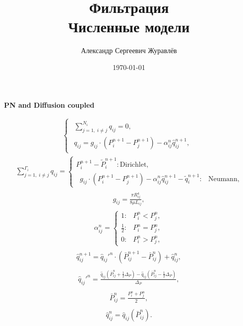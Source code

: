 \documentclass[a4paper,12pt,russian]{extreport}
\author{Александр Сергеевич Журавлёв}
\title{Фильтрация\\Численные модели}
\date{\today}
\begin{document}
\pagecolor{pageColor}
\color{fontColor}
\Russian
\printnomenclature[5em]


\begin{center}
{\large \textbf{PN and Diffusion coupled}}
\end{center}

\begin{eqnarray}
\begin{cases}
\begin{gathered}
\sum^{N_{i}}_{j=1, \; i\neq j} q_{ij} = 0,   \\
q_{ij} = g_{ij} \cdot \left(P^{n+1}_{i} - P^{n+1}_{j}\right) - \alpha^n_{ij} \hat{q}^{n+1}_{ij} ,
\end{gathered}
\end{cases}
\end{eqnarray}
%
\begin{eqnarray}
\sum^{\Gamma_{i}}_{j=1, \; i\neq j} q_{ij}=\begin{cases}
P^{n+1}_{i} - \tilde{P}^{n+1}_{i}: \text{Dirichlet},\\
\; \; g_{ij} \cdot \left(P^{n+1}_{i} - P^{n+1}_{j}\right) - \alpha^n_{ij} \hat{q}^{n+1}_{ij} - \tilde{q}^{n+1}_{i}: & \text{Neumann},
\end{cases}
\end{eqnarray}
%
\begin{eqnarray}
\begin{gathered}
g_{ij} = \frac{\pi R^4_{ij}}{8 \mu L_{ij}},
\end{gathered}
\end{eqnarray}
%
\begin{eqnarray}
\alpha^n_{ij} =\begin{cases}
1: & P^{n}_{i} < P^{n}_{j},\\
 \frac{1}{2} : & P^{n}_{i} = P^{n}_{j},\\
 0: & P^{n}_{i} > P^{n}_{j},
\end{cases}
\end{eqnarray}
%
\begin{eqnarray}
\begin{gathered}
\hat{q}_{ij}^{n+1} = \hat{q}_{ij}'^n \cdot \left(\bar{P}_{ij}^{n+1}-\bar{P}_{ij}^n\right)+\hat{q}_{ij}^n,
\end{gathered}
\end{eqnarray}
%
\begin{eqnarray}
\begin{gathered}
\hat{q}_{ij}'^n = \frac{\hat{q}_{ij}\left(\bar{P}_{ij}^n+ \frac{1}{2}\Delta_P\right)-
\hat{q}_{ij}\left(\bar{P}_{ij}^n-\frac{1}{2}\Delta_P\right)}{{\Delta_P}},
\end{gathered}
\end{eqnarray}
%
\begin{eqnarray}
\begin{gathered}
\bar{P}^{n}_{ij} = \frac{P^n_i+P^n_j}{2}, 
\end{gathered}
\end{eqnarray}
%
\begin{eqnarray}
\begin{gathered}
\hat{q}_{ij}^{n} = \hat{q}_{ij}\left(\bar{P}_{ij}^n\right).
\end{gathered}
\end{eqnarray}
%
\end{document}
